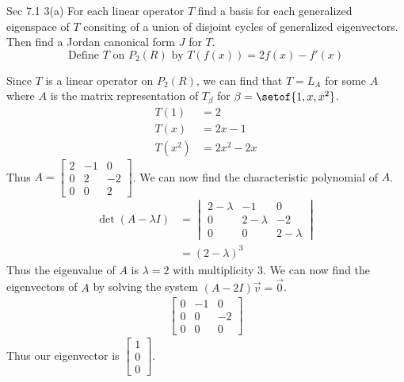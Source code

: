 \documentclass[answers,12pt,addpoints]{exam}
\begin{document}
\begin{questions}
    \question Sec 7.1 3(a)
    For each linear operator $T$ find a basis for each generalized eigenspace of $T$ consiting of a union of disjoint cycles of generalized eigenvectors. Then find a Jordan canonical form $J$ for $T$.
    $$ \text{Define } T \text{ on } P_2(R) \text{ by } T(f(x)) = 2f(x) - f'(x)$$
    \begin{solution}
       Since $T$ is a linear operator on $P_2(R)$, we can find that $T = L_A$ for some $A$ where $A$ is the matrix representation of $T_\beta$ for $\beta = \setof{1, x, x^2}$. 
       \begin{align*}
        T(1) &= 2\\
        T(x) &= 2x - 1\\
        T(x^2) &= 2x^2 - 2x
       \end{align*}
       Thus $A = \begin{bmatrix}
           2 & -1 & 0 \\
           0 & 2 & -2 \\
           0 & 0 & 2
         \end{bmatrix}$. We can now find the characteristic polynomial of $A$.
            \begin{align*}
                \det(A - \lambda I) &= \begin{vmatrix}
                    2 - \lambda & -1 & 0 \\
                    0 & 2 - \lambda & -2 \\
                    0 & 0 & 2 - \lambda
                \end{vmatrix} \\
                &= (2 - \lambda)^3
            \end{align*}
            Thus the eigenvalue of $A$ is $\lambda = 2$ with multiplicity 3. We can now find the eigenvectors of $A$ by solving the system $(A - 2I)\vec{v} = \vec{0}$.
            \begin{align*}
                \begin{bmatrix}
                    0 & -1 & 0 \\
                    0 & 0 & -2 \\
                    0 & 0 & 0
                \end{bmatrix}
            \end{align*}
            Thus our eigenvector is $\begin{bmatrix} 1\\ 0\\ 0 \end{bmatrix}$. \\

\end{solution}
\end{questions}
\end{document}
